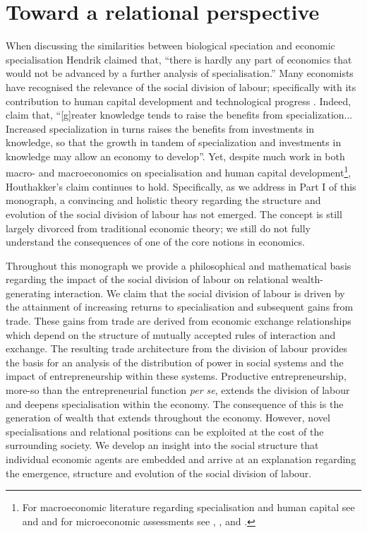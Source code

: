 \chapter{Toward a relational perspective} 
\label{ch:relationalperspective}

When discussing the similarities between biological speciation and economic specialisation Hendrik \citet[p.~182]{Houthakker1956} claimed that, ``there is hardly any part of economics that would not be advanced by a further analysis of specialisation.'' Many economists have recognised the relevance of the social division of labour; specifically with its contribution to human capital development and technological progress \citep{Liang2014}. Indeed, \citet[p.~1157]{BeckerMurphy1992} claim that, ``[g]reater knowledge tends to raise the benefits from specialization... Increased specialization in turns raises the benefits from investments in knowledge, so that the growth in tandem of specialization and investments in knowledge may allow an economy to develop''. Yet, despite much work in both macro- and macroeconomics on specialisation and human capital development\footnote{For macroeconomic literature regarding specialisation and human capital see \citet{Rosen1983} and \citet{Lucas1988} and for microeconomic assessments see \citet{YangBorland1991}, \citet{YangShi1992}, and \citet{ChengYang2004}.}, Houthakker's claim continues to hold. Specifically, as we address in Part I of this monograph, a convincing and holistic theory regarding the structure and evolution of the social division of labour has not emerged. The concept is still largely divorced from traditional economic theory; we still do not fully understand the consequences of one of the core notions in economics.

Throughout this monograph we provide a philosophical and mathematical basis regarding the impact of the social division of labour on relational wealth-generating interaction. We claim that the social division of labour is driven by the attainment of increasing returns to specialisation and subsequent gains from trade. These gains from trade are derived from economic exchange relationships which depend on the structure of mutually accepted rules of interaction and exchange. The resulting trade architecture from the division of labour provides the basis for an analysis of the distribution of power in social systems and the impact of entrepreneurship within these systems. Productive entrepreneurship, more-so than the entrepreneurial function \emph{per se}, extends the division of labour and deepens specialisation within the economy. The consequence of this is the generation of wealth that extends throughout the economy. However, novel specialisations and relational positions can be exploited at the cost of the surrounding society. We develop an insight into the social structure that individual economic agents are embedded and arrive at an explanation regarding the emergence, structure and evolution of the social division of labour. 

